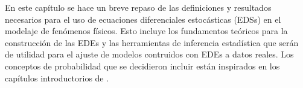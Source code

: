 En este capítulo se hace un breve repaso de las definiciones
y resultados necesarios para el uso de ecuaciones diferenciales 
estocásticas (EDSs) en el modelaje de fenómenos físicos. Esto 
incluye los fundamentos teóricos para la construcción de las EDEs 
y las herramientas de inferencia estadística que serán de 
utilidad para el ajuste de modelos contruidos con EDEs a datos 
reales. Los conceptos de probabilidad que se decidieron incluir 
están inspirados en los capítulos introductorios de 
\textcite{
arnoldStochasticDifferentialEquations1974,
oksendalStochasticDifferentialEquations2003,
maoStochasticDifferentialEquations2011,
rinconIntroduccionProcesosEstocasticos2012, 
dobrowIntroductionStochasticProcesses2016}. 





